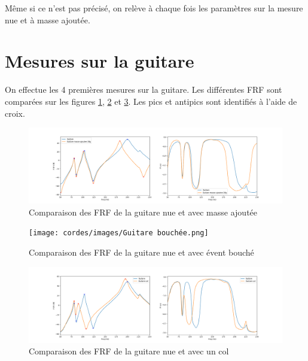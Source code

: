 \documentclass[atiam, article]{rapport} %
\begin{document}
Même si ce n'est pas précisé, on relève à chaque fois les paramètres sur la mesure nue et à masse ajoutée.

\section{Mesures sur la guitare}
On effectue les 4 premières mesures sur la guitare. Les différentes FRF sont comparées sur les figures \ref{fig:frf-guitare-masse}, \ref{fig:frf-guitare-bouchee} et \ref{fig:frf-guitare-col}. Les pics et antipics sont identifiés à l'aide de croix.

\begin{figure}
    \centering
    \includegraphics[width=\textwidth]{cordes/images/Guitare masse ajoutee 28g.png}
    \caption{Comparaison des FRF de la guitare nue et avec masse ajoutée}
    \label{fig:frf-guitare-masse}
\end{figure}

\begin{figure}
    \centering
    \texttt{[image: cordes/images/Guitare bouchée.png]}
    \caption{Comparaison des FRF de la guitare nue et avec évent bouché}
    \label{fig:frf-guitare-bouchee}
\end{figure}

\begin{figure}
    \centering
    \includegraphics[width=\textwidth]{cordes/images/Guitare col.png}
    \caption{Comparaison des FRF de la guitare nue et avec un col}
    \label{fig:frf-guitare-col}
\end{figure}
\end{document}
